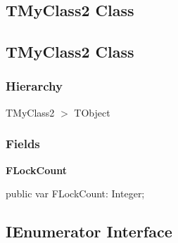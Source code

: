 \documentclass{report}
\newif\ifpdf
\begin{document}
\subsection*{\large{\textbf{TMyClass2 Class}}\normalsize\hspace{1ex}\hrulefill}
\else
\subsection*{TMyClass2 Class}
\fi
\label{ok_attributes.TMyClass2}
\subsubsection*{\large{\textbf{Hierarchy}}\normalsize\hspace{1ex}\hfill}
TMyClass2 {$>$} TObject
\subsubsection*{\large{\textbf{Fields}}\normalsize\hspace{1ex}\hfill}
\begin{list}{}{
\setlength{\itemindent}{0cm}
\setlength{\listparindent}{0cm}
\setlength{\leftmargin}{\evensidemargin}
\addtolength{\leftmargin}{\tmplength}
\settowidth{\labelsep}{X}
\addtolength{\leftmargin}{\labelsep}
\setlength{\labelwidth}{\tmplength}
}
\label{ok_attributes.TMyClass2-FLockCount}
\item[\textbf{FLockCount}\hfill]
\ifpdf
\begin{flushleft}
\fi
\begin{ttfamily}
public var FLockCount: Integer;\end{ttfamily}

\ifpdf
\end{flushleft}
\fi


\par  \end{list}
\ifpdf
\subsection*{\large{\textbf{IEnumerator Interface}}\normalsize\hspace{1ex}\hrulefill}
\else
\subsection*{IEnumerator Interface}
\fi
\label{ok_attributes.IEnumerator}
\end{document}
